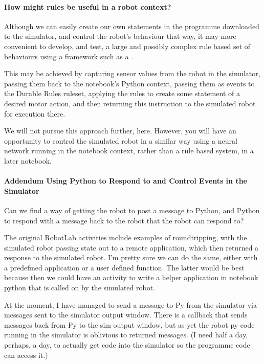 \documentclass[letterpaper,10pt,english]{sphinxmanual}
\begin{document}
{\paragraph{How might rules be useful in a robot context?}
\label{\detokenize{content/03_Robot_Lab/Section_00_04:How-might-rules-be-useful-in-a-robot-context?}}
Although we can easily create our own  statements in the programme downloaded to the simulator, and control the robot’s behaviour that way, it may more convenient to develop, and test, a large and possibly complex rule based set of behaviours using a framework such as a .

This may be achieved by capturing sensor values from the robot in the simulator, passing them back to the notebook’s Python context, passing them as events to the Durable Rules ruleset, applying the rules to create some statement of a desired motor action, and then returning this instruction to the simulated robot for execution there.

We will not pursue this approach further, here. However, you will have an opportunity to control the simulated robot in a similar way using a neural network running in the notebook context, rather than a rule based system, in a later notebook.


\paragraph{Addendum \sphinxhyphen{} Using Python to Respond to and Control Events in the Simulator}
\label{\detokenize{content/03_Robot_Lab/Section_00_04:Addendum---Using-Python-to-Respond-to-and-Control-Events-in-the-Simulator}}

Can we find a way of getting the robot to post a message to Python, and Python to respond with a message back to the robot that the robot can respond to?

The original RobotLab activities include examples of round\sphinxhyphen{}tripping, with the simulated robot passing state out to a remote application, which then returned a response to the simulated robot. I’m pretty sure we can do the same, either with a predefined application or a user defined function. The latter would be best because then we could have an activity to write a helper application in notebook python that is called on by the simulated robot.

At the moment, I have managed to send a message to Py from the simulator via messages sent to the simulator output window. There is a callback that sends messages back from Py to the sim output window, but as yet the robot py code running in the simulator is oblivious to returned messages. (I need half a day, perhaps, a day, to actually get code into the simulator so the programme code can access it.)

}
\end{document}
